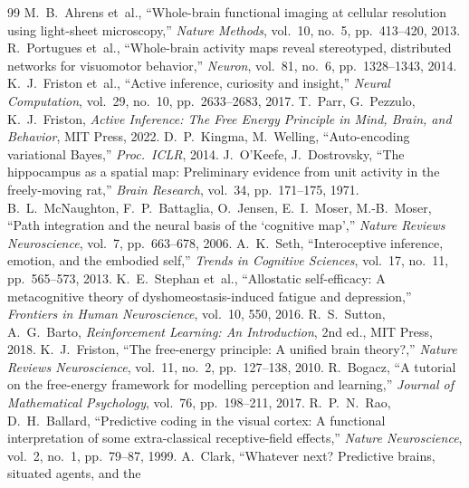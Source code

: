 \documentclass[11pt,a4paper]{article}
\begin{document}
\begin{thebibliography}{99}
  M.~B.~Ahrens et~al.,
  ``Whole-brain functional imaging at cellular resolution using light-sheet microscopy,''
  \textit{Nature Methods}, vol.~10, no.~5, pp.~413--420, 2013.
  R.~Portugues et~al.,
  ``Whole-brain activity maps reveal stereotyped, distributed networks for visuomotor behavior,''
  \textit{Neuron}, vol.~81, no.~6, pp.~1328--1343, 2014.
  K.~J.~Friston et~al.,
  ``Active inference, curiosity and insight,''
  \textit{Neural Computation}, vol.~29, no.~10, pp.~2633--2683, 2017.
  T.~Parr, G.~Pezzulo, K.~J.~Friston,
  \textit{Active Inference: The Free Energy Principle in Mind, Brain, and Behavior},
  MIT Press, 2022.
  D.~P.~Kingma, M.~Welling,
  ``Auto-encoding variational Bayes,''
  \textit{Proc.\ ICLR}, 2014.
  J.~O'Keefe, J.~Dostrovsky,
  ``The hippocampus as a spatial map: Preliminary evidence from unit activity
  in the freely-moving rat,''
  \textit{Brain Research}, vol.~34, pp.~171--175, 1971.
  B.~L.~McNaughton, F.~P.~Battaglia, O.~Jensen, E.~I.~Moser, M.-B.~Moser,
  ``Path integration and the neural basis of the `cognitive map',''
  \textit{Nature Reviews Neuroscience}, vol.~7, pp.~663--678, 2006.
  A.~K.~Seth,
  ``Interoceptive inference, emotion, and the embodied self,''
  \textit{Trends in Cognitive Sciences}, vol.~17, no.~11, pp.~565--573, 2013.
  K.~E.~Stephan et~al.,
  ``Allostatic self-efficacy: A metacognitive theory of dyshomeostasis-induced
  fatigue and depression,''
  \textit{Frontiers in Human Neuroscience}, vol.~10, 550, 2016.
  R.~S.~Sutton, A.~G.~Barto,
  \textit{Reinforcement Learning: An Introduction}, 2nd ed.,
  MIT Press, 2018.
  K.~J.~Friston,
  ``The free-energy principle: A unified brain theory?,''
  \textit{Nature Reviews Neuroscience}, vol.~11, no.~2, pp.~127--138, 2010.
  R.~Bogacz,
  ``A tutorial on the free-energy framework for modelling perception and learning,''
  \textit{Journal of Mathematical Psychology}, vol.~76, pp.~198--211, 2017.
  R.~P.~N.~Rao, D.~H.~Ballard,
  ``Predictive coding in the visual cortex: A functional interpretation
  of some extra-classical receptive-field effects,''
  \textit{Nature Neuroscience}, vol.~2, no.~1, pp.~79--87, 1999.
  A.~Clark,
  ``Whatever next? Predictive brains, situated agents, and the

\end{thebibliography}
\end{document}
